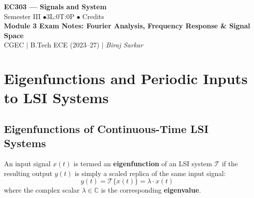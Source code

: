 \documentclass[12pt,a4paper]{article}
\begin{document}
\begin{center}
  {\LARGE\bfseries\color{myred} EC303 --- Signals and System}\\[5pt]
  {\normalsize\color{mydark} Semester III \quad$\bullet$\quad 3L:0T:0P \quad$\bullet$ Credits}\\[3pt]
  {\normalsize\color{myteal}\textbf{Module 3 Exam Notes: Fourier Analysis, Frequency Response \& Signal Space}}\\[3pt]
  {\small\color{mydark} CGEC \;$|$\; B.Tech ECE (2023--27) \;$|$\; \textit{Biraj Sarkar}}
\end{center}
\vspace{2pt}
\noindent{\color{myred}\rule{\linewidth}{1.5pt}}
\vspace{2pt}

\hypersetup{linkcolor=mydark}
\tableofcontents
\hypersetup{linkcolor=myteal}
\newpage

\section{Eigenfunctions and Periodic Inputs to LSI Systems}

\subsection{Eigenfunctions of Continuous-Time LSI Systems}

\begin{tcolorbox}[defbox, title={\textbf{Definition: Eigenfunction of an LSI System}}]
An input signal $x(t)$ is termed an \textbf{eigenfunction} of an LSI system $\mathcal{T}$ if the resulting output $y(t)$ is simply a scaled replica of the same input signal:
\begin{equation}
  y(t) = \mathcal{T}\{x(t)\} = \lambda \cdot x(t)
\end{equation}
where the complex scalar $\lambda \in \mathbb{C}$ is the corresponding \textbf{eigenvalue}.
\end{tcolorbox}
\end{document}
